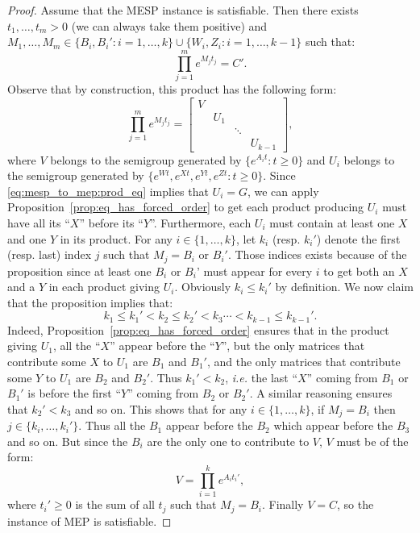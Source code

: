 \begin{proof}
Assume that the MESP instance is satisfiable. Then there exists $t_1,\ldots,t_m>0$ (we can always take them positive)
and $M_1,\ldots,M_m\in\big\{B_i,B_i':i=1,\ldots,k\}\cup\big\{W_i,Z_i:i=1,\ldots,k-1\big\}$
such that:
\begin{equation}\label{eq:mesp_to_mep:prod_eq}
\prod_{j=1}^me^{M_jt_j}=C'.
\end{equation}
Observe that by construction, this product has the following form:
\[\prod_{j=1}^me^{M_jt_j}=\begin{bmatrix}V&&&\\&U_1&&\\&&\ddots&\\&&&U_{k-1}\end{bmatrix},\]
where $V$ belongs to the semigroup generated by $\{e^{A_it}:t\geqslant0\}$ and $U_i$ belongs
to the semigroup generated by $\{e^{Wt},e^{Xt},e^{Yt},e^{Zt}:t\geqslant0\}$. Since
\eqref{eq:mesp_to_mep:prod_eq} implies that $U_i=G$, we can apply Proposition~\ref{prop:eq_has_forced_order}
to get each product producing $U_i$ must have all its ``$X$'' before its ``$Y$''. Furthermore, each $U_i$
must contain at least one $X$ and one $Y$ in its product. For any $i\in\{1,\ldots,k\}$,
let $k_i$ (resp. $k_i'$) denote
the first (resp. last) index $j$ such that $M_j=B_i\text{ or }B_i'$. Those indices exists because
of the proposition since at least one $B_i$ or $B_i$' must appear for every $i$
to get both an $X$ and a $Y$ in each product giving $U_i$. Obviously $k_i\leqslant k_i'$
by definition. We now claim that the proposition implies that:
\[k_1\leqslant k_1'<k_2\leqslant k_2'<k_3\cdots<k_{k-1}\leqslant k_{k-1}'.\]
Indeed, Proposition~\ref{prop:eq_has_forced_order} ensures that in the product giving $U_1$,
all the ``$X$'' appear before the ``$Y$'',
but the only matrices that contribute some $X$ to $U_1$ are $B_1$ and $B_1'$,
and the only matrices that contribute some $Y$ to $U_1$ are $B_2$ and $B_2'$.
Thus $k_1'<k_2$, \emph{i.e.} the last ``$X$'' coming from $B_1$ or $B_1'$ is before the first ``$Y$''
coming from $B_2$ or $B_2'$. A similar reasoning ensures that $k_2'<k_3$ and so on.
This shows that for any $i\in\{1,\ldots,k\}$, if $M_j=B_i$ then $j\in\{k_i,\ldots,k_i'\}$. Thus all
the $B_1$ appear before the $B_2$ which appear before the $B_3$ and so on.
But since the $B_i$ are the only one to contribute to $V$, $V$ must be of the form:
\[V=\prod_{i=1}^ke^{A_it_i'},\]
where $t_i'\geqslant0$ is the sum of all $t_j$ such that $M_j=B_i$.
Finally $V=C$, so the instance of MEP is satisfiable.

\end{proof}